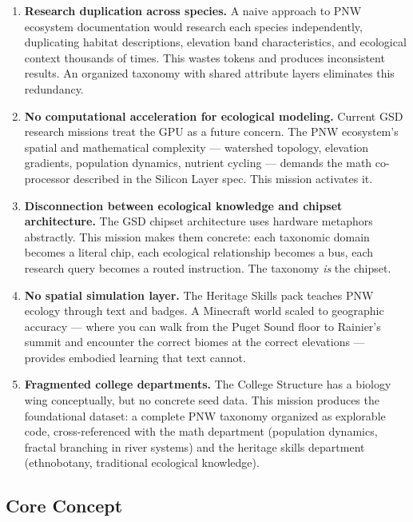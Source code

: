 \documentclass[11pt,letterpaper]{article}
\begin{document}
\begin{enumerate}[leftmargin=2em]
\item \textbf{Research duplication across species.} A naive approach to PNW ecosystem documentation would research each species independently, duplicating habitat descriptions, elevation band characteristics, and ecological context thousands of times. This wastes tokens and produces inconsistent results. An organized taxonomy with shared attribute layers eliminates this redundancy.

\item \textbf{No computational acceleration for ecological modeling.} Current GSD research missions treat the GPU as a future concern. The PNW ecosystem's spatial and mathematical complexity --- watershed topology, elevation gradients, population dynamics, nutrient cycling --- demands the math co-processor described in the Silicon Layer spec. This mission activates it.

\item \textbf{Disconnection between ecological knowledge and chipset architecture.} The GSD chipset architecture uses hardware metaphors abstractly. This mission makes them concrete: each taxonomic domain becomes a literal chip, each ecological relationship becomes a bus, each research query becomes a routed instruction. The taxonomy \emph{is} the chipset.

\item \textbf{No spatial simulation layer.} The Heritage Skills pack teaches PNW ecology through text and badges. A Minecraft world scaled to geographic accuracy --- where you can walk from the Puget Sound floor to Rainier's summit and encounter the correct biomes at the correct elevations --- provides embodied learning that text cannot.

\item \textbf{Fragmented college departments.} The College Structure has a biology wing conceptually, but no concrete seed data. This mission produces the foundational dataset: a complete PNW taxonomy organized as explorable code, cross-referenced with the math department (population dynamics, fractal branching in river systems) and the heritage skills department (ethnobotany, traditional ecological knowledge).
\end{enumerate}

\subsection{Core Concept}
\end{document}
